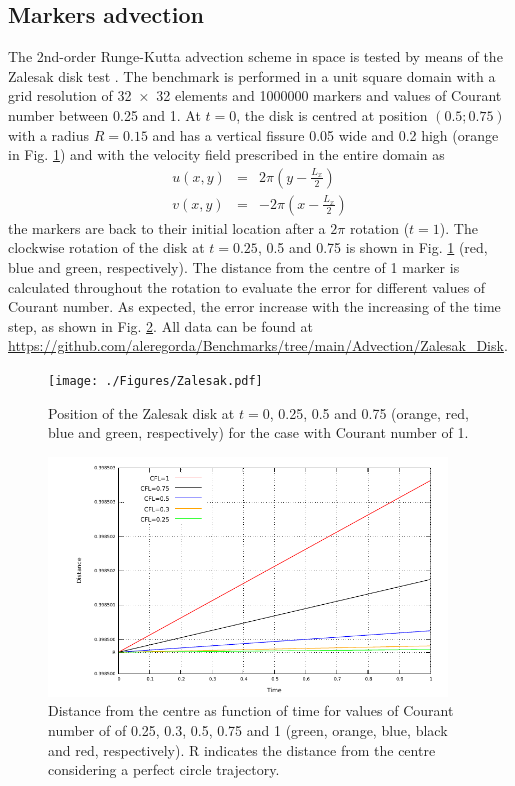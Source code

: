 \documentclass[hidelinks,10pt,a4paper]{article}
\begin{document}
\subsection{Markers advection}\label{sec:runge}
The 2nd-order Runge-Kutta advection scheme in space is tested by means of the Zalesak disk test \citep{Zalesak1979,Thieulot2014}. The benchmark is performed
in a unit square domain with a grid resolution of \num{32x32} elements and 1000000 markers and values of Courant number between 0.25 and 1.
At $t=0$, the disk is centred at position $(0.5;0.75)$ with a radius $R=0.15$ and has a vertical fissure 0.05 wide and 0.2 high (orange in Fig. \ref{fig:runge})
and with the velocity field prescribed in the entire domain as
\begin{eqnarray}
u(x,y)&=&2\pi\left(y-\frac{L_x}{2}\right)\nonumber \\
v(x,y)&=&-2\pi\left(x-\frac{L_x}{2}\right)\nonumber
\end{eqnarray}
the markers are back to their initial location after a $2\pi$ rotation ($t=1$). The clockwise rotation of the disk at $t=0.25$, 0.5 and 0.75 
is shown in Fig. \ref{fig:runge} (red, blue and green, respectively). The distance from the centre of 1 marker is calculated throughout the rotation to
evaluate the error for different values of Courant number. As expected, the error increase with the increasing of the time step, as shown in 
Fig. \ref{fig:runge_err}. 
All data can be found at \url{https://github.com/aleregorda/Benchmarks/tree/main/Advection/Zalesak_Disk}.

\begin{figure}
\centering
\noindent\texttt{[image: ./Figures/Zalesak.pdf]}
\caption{Position of the Zalesak disk at $t=0$, 0.25, 0.5 and 0.75 (orange, red, blue and green, respectively) for the case with Courant number of 1.}
\label{fig:runge}
\end{figure}

\begin{figure}
\centering
\noindent\includegraphics[width=400px]{./Figures/zal_marker.pdf}
\caption{Distance from the centre as function of time for values of Courant number of  of 0.25, 0.3, 0.5, 0.75 and 1 (green, orange, blue, black and red,
respectively). R indicates the distance from the centre considering a perfect circle trajectory.}
\label{fig:runge_err}
\end{figure}
\end{document}
